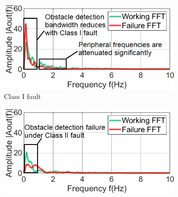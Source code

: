 \documentclass[manuscript,screen,review]{acmart} %
\providecommand{\DIFdel}[1]{{\protect\color{red}\sout{#1}}}                      %
\providecommand{\DIFdelFL}[1]{\DIFdel{#1}} %
\providecommand{\DIFaddbeginFL}{} %
\providecommand{\DIFaddendFL}{} %
\providecommand{\DIFdelbeginFL}{} %
\providecommand{\DIFdelendFL}{} %
\newcommand{\DIFscaledelfig}{0.5}
\newlength{\DIFdelgraphicswidth} %
\newlength{\DIFdelgraphicsheight} %
\newcommand{\DIFaddincludegraphics}[2][]{{\color{blue}\fbox{\DIFOincludegraphics[#1]{#2}}}} %
\newcommand{\DIFdelincludegraphics}[2][]{%
\sbox{\DIFdelgraphicsbox}{\DIFOincludegraphics[#1]{#2}}%
\settoboxwidth{\DIFdelgraphicswidth}{\DIFdelgraphicsbox} %
\settoboxtotalheight{\DIFdelgraphicsheight}{\DIFdelgraphicsbox} %
\scalebox{\DIFscaledelfig}{%
\parbox[b]{\DIFdelgraphicswidth}{\usebox{\DIFdelgraphicsbox}\\[-\baselineskip] \rule{\DIFdelgraphicswidth}{0em}}\llap{\resizebox{\DIFdelgraphicswidth}{\DIFdelgraphicsheight}{%
\setlength{\unitlength}{\DIFdelgraphicswidth}%
\begin{picture}(1,1)%
\thicklines\linethickness{2pt} %
{\color[rgb]{1,0,0}\put(0,0){\framebox(1,1){}}}%
{\color[rgb]{1,0,0}\put(0,0){\line( 1,1){1}}}%
{\color[rgb]{1,0,0}\put(0,1){\line(1,-1){1}}}%
\end{picture}%
}\hspace*{3pt}}} %
} %
\DeclareRobustCommand{\DIFaddbeginFL}{\DIFOaddbeginFL \let\includegraphics\DIFaddincludegraphics} %
\DeclareRobustCommand{\DIFaddendFL}{\DIFOaddendFL \let\includegraphics\DIFOincludegraphics} %
\DeclareRobustCommand{\DIFdelbeginFL}{\DIFOdelbeginFL \let\includegraphics\DIFdelincludegraphics} %
\DeclareRobustCommand{\DIFdelendFL}{\DIFOaddendFL \let\includegraphics\DIFOincludegraphics} %
\begin{document}
\begin{figure}\centering
\DIFdelbeginFL %
\DIFdelendFL \DIFaddbeginFL \begin{subfigure}[t]{0.33\textwidth}
		\DIFaddendFL \centering
\DIFdelbeginFL %
\DIFdelendFL \DIFaddbeginFL \includegraphics[width=\textwidth]{figures/2-PIR-Fault/normal-classI/class1_fft_coloradj_small_edited_camera_ready.png}
		\DIFaddendFL \caption{Class I fault}
		\label{fig:classI_fault_freq}
	\end{subfigure}
	\DIFdelbeginFL \DIFdelFL{\hspace{1ex}
	}%
\DIFdelendFL \DIFaddbeginFL \begin{subfigure}[t]{0.33\textwidth}
		\DIFaddendFL \centering
\DIFdelbeginFL %
\DIFdelendFL \DIFaddbeginFL \includegraphics[width=\textwidth]{figures/2-PIR-Fault/normal-classII-deformed/class2_fft_coloradj_small_edited_camera_ready.png}

\end{subfigure}
\end{figure}
\end{document}
